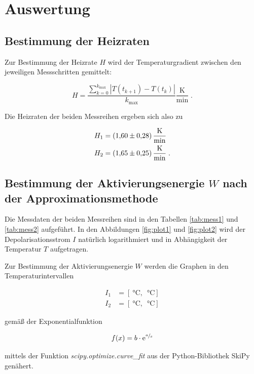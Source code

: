 \section{Auswertung}
\label{sec:Auswertung}

\subsection{Bestimmung der Heizraten}

Zur Bestimmung der Heizrate $H$ wird der Temperaturgradient zwischen den jeweiligen Messschritten gemittelt:

\begin{equation}
  H = \frac{ \sum_{k=0}^{k_\text{max}} |T(t_{k+1}) - T(t_k)|}{k_\text{max}} \frac{\si{\kelvin}}{\si{\minute}} \; .
\end{equation}

Die Heizraten der beiden Messreihen ergeben sich also zu

\begin{align*}
  H_1 &= \SI{1.60 +- 0.28}{\kelvin\per\minute} \\
  H_2 &= \SI{1.65 +- 0.25}{\kelvin\per\minute} \; .
\end{align*}

\subsection{Bestimmung der Aktivierungsenergie $W$ nach der Approximationsmethode}

Die Messdaten der beiden Messreihen sind in den Tabellen \ref{tab:mess1} und \ref{tab:mess2} aufgeführt.
In den Abbildungen \ref{fig:plot1} und \ref{fig:plot2} wird der Depolarisationsstrom $I$ natürlich logarithmiert und in Abhängigkeit der Temperatur $T$
aufgetragen.

Zur Bestimmung der Aktivierungsenergie $W$ werden die Graphen in den Temperaturintervallen

\begin{align*}
  I_1 &= [\SI{}{\celsius}, \; \SI{}{\celsius}] \\
  I_2 &= [\SI{}{\celsius}, \; \SI{}{\celsius}]
\end{align*}

gemäß der Exponentialfunktion 

\begin{equation}
  f(x) = b \cdot \text{e}^{\sfrac{a}{x}}
\end{equation}

mittels der Funktion \textit{scipy.optimize.curve\_fit} aus der Python-Bibliothek SkiPy genähert.

